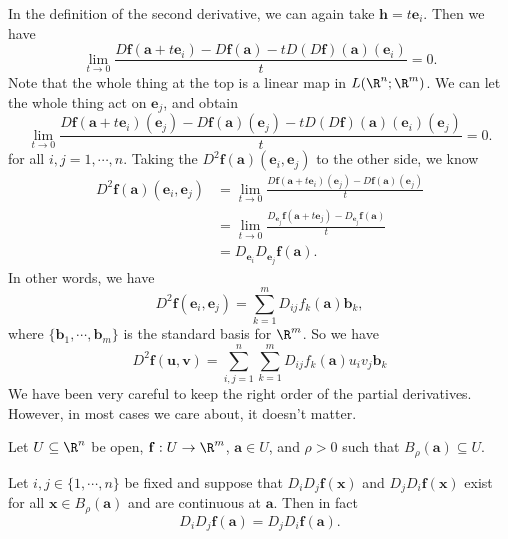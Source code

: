 \documentclass[a4paper]{article}
\begin{document}
In the definition of the second derivative, we can again take $\mathbf{h} = t \mathbf{e}_i$. Then we have
\[
  \lim_{t \to 0} \frac{D \mathbf{f}(\mathbf{a} + t \mathbf{e}_i) - D \mathbf{f}(\mathbf{a}) - t D(D \mathbf{f})(\mathbf{a})(\mathbf{e}_i)}{t} = 0.
\]
Note that the whole thing at the top is a linear map in $L(\R^n; \R^m)$. We can let the whole thing act on $\mathbf{e}_j$, and obtain
\[
  \lim_{t \to 0} \frac{D \mathbf{f}(\mathbf{a} + t \mathbf{e}_i)(\mathbf{e}_j) - D \mathbf{f}(\mathbf{a}) (\mathbf{e}_j) - t D (D \mathbf{f})(\mathbf{a})(\mathbf{e}_i)(\mathbf{e}_j)}{t} = 0.
\]
for all $i, j = 1, \cdots, n$. Taking the $D^2 \mathbf{f}(\mathbf{a})(\mathbf{e}_i, \mathbf{e}_j)$ to the other side, we know
\begin{align*}
  D^2 \mathbf{f}(\mathbf{a}) (\mathbf{e}_i, \mathbf{e}_j) &= \lim_{t \to 0} \frac{D\mathbf{f}(\mathbf{a} + t \mathbf{e}_i)(\mathbf{e}_j) - D \mathbf{f}(\mathbf{a})(\mathbf{e}_j)}{t}\\
  &= \lim_{t \to 0} \frac{D_{\mathbf{e}_j} \mathbf{f}(\mathbf{a} + t \mathbf{e}_j) - D_{\mathbf{e}_j} \mathbf{f}(\mathbf{a})}{t}\\
  &= D_{\mathbf{e}_i} D_{\mathbf{e}_j} \mathbf{f}(\mathbf{a}).
\end{align*}
In other words, we have
\[
  D^2 \mathbf{f}(\mathbf{e}_i, \mathbf{e}_j) = \sum_{k = 1}^m D_{ij} f_k(\mathbf{a}) \mathbf{b}_k,
\]
where $\{\mathbf{b}_1, \cdots, \mathbf{b}_m\}$ is the standard basis for $\R^m$. So we have
\[
  D^2 \mathbf{f}(\mathbf{u}, \mathbf{v}) = \sum_{i, j = 1}^n \sum_{k = 1}^m D_{ij} f_k (\mathbf{a}) u_i v_j \mathbf{b}_k
\]
We have been very careful to keep the right order of the partial derivatives. However, in most cases we care about, it doesn't matter.
\begin{thm}
  Let $U \subseteq \R^n$ be open, $\mathbf{f}: U \to \R^m$, $\mathbf{a} \in U$, and $\rho > 0$ such that $B_\rho(\mathbf{a}) \subseteq U$.

  Let $i, j \in \{1, \cdots, n\}$ be fixed and suppose that $D_i D_j \mathbf{f}(\mathbf{x})$ and $D_j D_i \mathbf{f}(\mathbf{x})$ exist for all $\mathbf{x} \in B_\rho(\mathbf{a})$ and are continuous at $\mathbf{a}$. Then in fact
  \[
    D_i D_j \mathbf{f}(\mathbf{a}) = D_j D_i \mathbf{f}(\mathbf{a}).
  \]
\end{thm}
\end{document}
